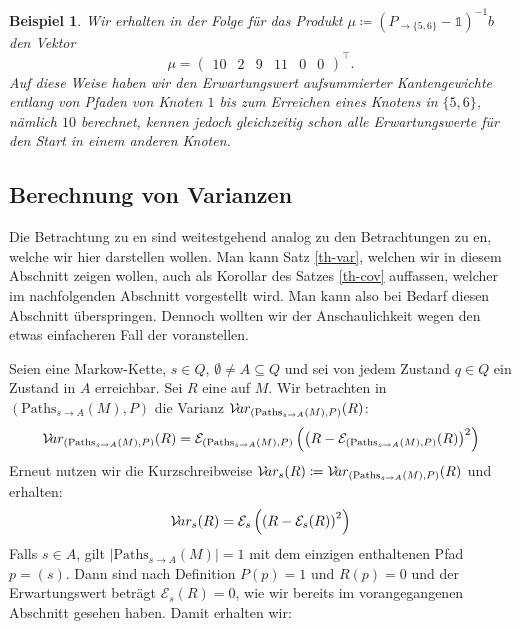 \documentclass[a4paper]{article}
\newcommand{\mc}{Markow-Kette}
\newtheorem{beispiel}[satz]{Beispiel}
\theoremstyle{nonumberplain}
\begin{document}
\begin{beispiel}
	Wir erhalten in der Folge für das Produkt $\mu \coloneqq (P_{\rightarrow \{5,6\}} - \mathbb{1})^{-1}b$ den Vektor
	\begin{equation*}
		\mu = \begin{pmatrix} 10 & 2 & 9 & 11 & 0 & 0 \end{pmatrix}^\intercal\text{.}
	\end{equation*}
	Auf diese Weise haben wir den Erwartungswert aufsummierter Kantengewichte entlang von Pfaden von Knoten $1$ bis zum Erreichen eines Knotens in $\{5,6\}$, nämlich $10$ berechnet, kennen jedoch gleichzeitig schon alle Erwartungswerte für den Start in einem anderen Knoten.
\end{beispiel}

\subsection{Berechnung von Varianzen}

Die Betrachtung zu \cov{}en sind weitestgehend analog zu den Betrachtungen zu \var{}en, welche wir hier darstellen wollen. Man kann Satz \ref{th-var}, welchen wir in diesem Abschnitt zeigen wollen, auch als Korollar des Satzes \ref{th-cov} auffassen, welcher im nachfolgenden Abschnitt vorgestellt wird. Man kann also bei Bedarf diesen Abschnitt überspringen. Dennoch wollten wir der Anschaulichkeit wegen den etwas einfacheren Fall der \var{} voranstellen.

Seien \mcex{} eine \mc{}, $s \in Q$, $\emptyset \neq A \subseteq Q$ und  sei von jedem Zustand $q\in Q$ ein Zustand in $A$ erreichbar. Sei $R$ eine  \reward{} auf $M$. Wir betrachten in $(\mathrm{Paths}_{s \rightarrow A}(M), P)$ die Varianz $\mathcal{V}\!ar_{(\mathrm{Paths}_{s \rightarrow A}(M), P)}(R)$:
\begin{equation}
	\mathcal{V}\!ar_{(\mathrm{Paths}_{s \rightarrow A}(M), P)}(R) = \mathcal{E}_{(\mathrm{Paths}_{s \rightarrow A}(M), P)}\left(\left(R - \mathcal{E}_{(\mathrm{Paths}_{s \rightarrow A}(M), P)} (R)\right)^{2}\right) 
\end{equation}
Erneut nutzen wir die Kurzschreibweise $\mathcal{V}\!ar_{s}(R) \coloneqq \mathcal{V}\!ar_{(\mathrm{Paths}_{s \rightarrow A}(M), P)}(R)$ und erhalten:
\begin{equation}
\mathcal{V}\!ar_{s}(R) = \mathcal{E}_{s}\left(\left(R - \mathcal{E}_{s} (R)\right)^{2}\right)
\end{equation}
Falls $s \in A$, gilt $|\mathrm{Paths}_{s \rightarrow A}(M)| = 1$ mit dem einzigen enthaltenen Pfad $p = (s)$. Dann sind nach Definition $P(p) = 1$ und $R(p) = 0$ und der Erwartungswert beträgt $\mathcal{E}_{s}(R) = 0$, wie wir bereits im vorangegangenen Abschnitt gesehen haben. Damit erhalten wir:
\end{document}
